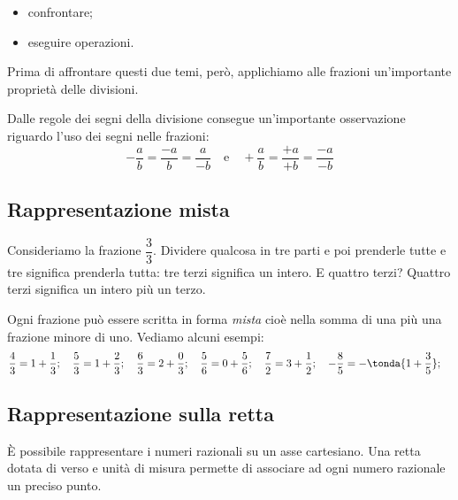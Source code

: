 
\begin{itemize} [nosep] %
 \item confrontare;
 \item eseguire operazioni.
\end{itemize}

Prima di affrontare questi due temi, però, applichiamo alle frazioni 
un'importante proprietà delle divisioni.

\begin{osservazione}{}{}
 Dalle regole dei segni della divisione consegue un'importante osservazione 
riguardo l'uso dei segni nelle frazioni:
\[-\dfrac{a}{b} = \dfrac{-a}{b} = \dfrac{a}{-b} \quad \text{e} \quad
  +\dfrac{a}{b} = \dfrac{+a}{+b} = \dfrac{-a}{-b}
\]
\end{osservazione}

\subsection{Rappresentazione mista}
\label{sub:razionali_rappresentazione_mista}

Consideriamo la frazione \(\dfrac{3}{3}\). Dividere qualcosa in tre parti e 
poi prenderle tutte e tre significa prenderla tutta: tre terzi significa 
un intero. E quattro terzi? Quattro terzi significa un intero più un terzo.

Ogni frazione può essere scritta in forma 
\emph{mista} cioè nella somma di 
una  più una frazione minore di uno. Vediamo alcuni esempi:
\[\frac{4}{3} = 1 + \frac{1}{3}; \quad
\frac{5}{3} = 1 + \frac{2}{3}; \quad
\frac{6}{3} = 2 + \frac{0}{3}; \quad
\frac{5}{6} = 0 + \frac{5}{6}; \quad
\frac{7}{2} = 3 + \frac{1}{2}; \quad
-\frac{8}{5} = -\tonda{1 + \frac{3}{5}}; \quad
\]

\subsection{Rappresentazione sulla retta}
\label{sub:razionali_rappresentazione_retta}

È possibile rappresentare i numeri razionali su 
un asse cartesiano. Una 
retta dotata di verso e unità di misura permette di associare ad ogni 
numero razionale un preciso punto. 


